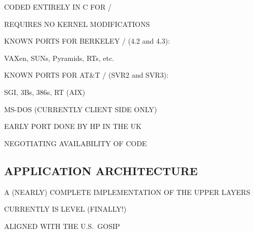 \begin{bwslide}

\begin{nrtc}
\item	CODED ENTIRELY IN C FOR \unix/
    \begin{nrtc}
    \item	REQUIRES NO KERNEL MODIFICATIONS    
    \end{nrtc}

\item	KNOWN PORTS FOR BERKELEY \unix/ (4.2 and 4.3):
    \begin{nrtc}
    \item	VAXen, SUNs, Pyramids, RTs, etc.
    \end{nrtc}

\item	KNOWN PORTS FOR AT\&T \unix/ (SVR2 and SVR3):
    \begin{nrtc}
    \item	SGI, 3Bs, 386s, RT (AIX)
    \end{nrtc}

\item	MS-DOS (CURRENTLY CLIENT SIDE ONLY)
    \begin{nrtc}
    \item	EARLY PORT DONE BY HP IN THE UK

    \item	NEGOTIATING AVAILABILITY OF CODE
    \end{nrtc}
\end{nrtc}
\end{bwslide}


\begin{bwslide}
\part*	{APPLICATION ARCHITECTURE}\bf

\begin{nrtc}
\item	A (NEARLY) COMPLETE IMPLEMENTATION OF THE UPPER LAYERS

\item	CURRENTLY IS LEVEL (FINALLY!)

\item	ALIGNED WITH THE U.S.~GOSIP
\end{nrtc}
\end{bwslide}




